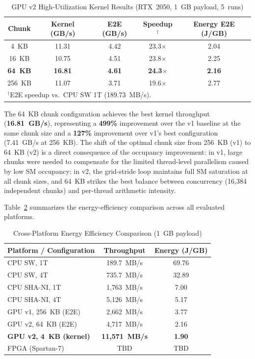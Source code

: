 \documentclass[conference]{IEEEtran}
\begin{document}
\begin{table}[htbp]
  \caption{GPU v2 High-Utilization Kernel Results (RTX~2050, 1~GB payload, 5~runs)}
  \label{tab:gpu_v2}
  \centering
  \begin{tabular}{ccccc}
    \toprule
    \textbf{Chunk} & \textbf{Kernel (GB/s)} & \textbf{E2E (GB/s)} & \textbf{Speedup$^{\dagger}$} & \textbf{Energy E2E (J/GB)} \\
    \midrule
    4~KB            & 11.31 & 4.42 & 23.3$\times$ & 2.04 \\
    16~KB           & 10.75 & 4.51 & 23.8$\times$ & 2.25 \\
    \textbf{64~KB}  & \textbf{16.81} & \textbf{4.61} & \textbf{24.3$\times$} & \textbf{2.16} \\
    256~KB          & 11.07 & 3.71 & 19.6$\times$ & 2.77 \\
    \bottomrule
    \multicolumn{5}{l}{\footnotesize $^{\dagger}$E2E speedup vs.\ CPU SW 1T (189.73~MB/s).}
  \end{tabular}
\end{table}

The 64~KB chunk configuration achieves the best kernel throughput
(\textbf{16.81~GB/s}), representing a \textbf{499\%} improvement over
the v1 baseline at the same chunk size and a \textbf{127\%} improvement
over v1's best configuration (7.41~GB/s at 256~KB).
The shift of the optimal chunk size from 256~KB (v1) to 64~KB (v2) is
a direct consequence of the occupancy improvement: in v1, large chunks
were needed to compensate for the limited thread-level parallelism caused
by low SM occupancy; in v2, the grid-stride loop maintains full SM
saturation at all chunk sizes, and 64~KB strikes the best balance between
concurrency (16{,}384 independent chunks) and per-thread arithmetic intensity.

Table~\ref{tab:gpu_energy} summarizes the energy-efficiency comparison
across all evaluated platforms.

\begin{table}[htbp]
  \caption{Cross-Platform Energy Efficiency Comparison (1~GB payload)}
  \label{tab:gpu_energy}
  \centering
  \begin{tabular}{lcc}
    \toprule
    \textbf{Platform / Configuration} & \textbf{Throughput} & \textbf{Energy (J/GB)} \\
    \midrule
    CPU SW, 1T                     & 189.7~MB/s   & 69.76 \\
    CPU SW, 4T                     & 735.7~MB/s   & 32.89 \\
    CPU SHA-NI, 1T                 & 1{,}763~MB/s  & 7.00 \\
    CPU SHA-NI, 4T                 & 5{,}126~MB/s  & 5.17 \\
    GPU v1, 256~KB (E2E)           & 2{,}662~MB/s  & 3.77 \\
    GPU v2, 64~KB (E2E)            & 4{,}717~MB/s  & 2.16 \\
    \textbf{GPU v2, 4~KB (kernel)} & \textbf{11{,}571~MB/s} & \textbf{1.90} \\
    FPGA (Spartan-7)               & TBD           & TBD \\
    \bottomrule
  \end{tabular}
\end{table}
\end{document}
